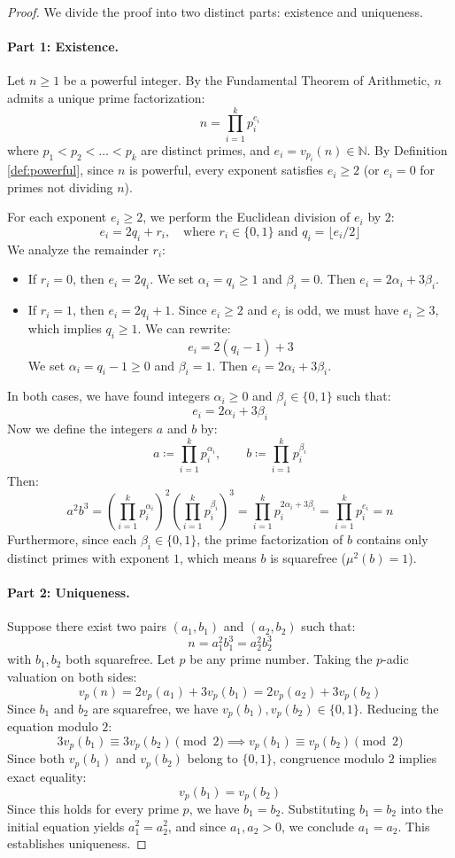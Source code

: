 \documentclass[11pt,a4paper]{article}
\theoremstyle{definition}
\begin{document}
\begin{proof}
We divide the proof into two distinct parts: existence and uniqueness.

\paragraph{Part 1: Existence.}
Let $n \ge 1$ be a powerful integer. By the Fundamental Theorem of Arithmetic, $n$ admits a unique prime factorization:
\[ n = \prod_{i=1}^k p_i^{e_i} \]
where $p_1 < p_2 < \dots < p_k$ are distinct primes, and $e_i = v_{p_i}(n) \in \mathbb{N}$.
By Definition \ref{def:powerful}, since $n$ is powerful, every exponent satisfies $e_i \ge 2$ (or $e_i = 0$ for primes not dividing $n$).

For each exponent $e_i \ge 2$, we perform the Euclidean division of $e_i$ by $2$:
\[ e_i = 2 q_i + r_i, \quad \text{where } r_i \in \{0, 1\} \text{ and } q_i = \lfloor e_i / 2 \rfloor \]
We analyze the remainder $r_i$:
\begin{itemize}
    \item If $r_i = 0$, then $e_i = 2 q_i$. We set $\alpha_i = q_i \ge 1$ and $\beta_i = 0$. Then $e_i = 2\alpha_i + 3\beta_i$.
    \item If $r_i = 1$, then $e_i = 2 q_i + 1$. Since $e_i \ge 2$ and $e_i$ is odd, we must have $e_i \ge 3$, which implies $q_i \ge 1$.
    We can rewrite:
    \[ e_i = 2(q_i - 1) + 3 \]
    We set $\alpha_i = q_i - 1 \ge 0$ and $\beta_i = 1$. Then $e_i = 2\alpha_i + 3\beta_i$.
\end{itemize}
In both cases, we have found integers $\alpha_i \ge 0$ and $\beta_i \in \{0, 1\}$ such that:
\[ e_i = 2\alpha_i + 3\beta_i \]
Now we define the integers $a$ and $b$ by:
\[ a \coloneqq \prod_{i=1}^k p_i^{\alpha_i}, \qquad b \coloneqq \prod_{i=1}^k p_i^{\beta_i} \]
Then:
\[ a^2 b^3 = \left(\prod_{i=1}^k p_i^{\alpha_i}\right)^2 \left(\prod_{i=1}^k p_i^{\beta_i}\right)^3 = \prod_{i=1}^k p_i^{2\alpha_i + 3\beta_i} = \prod_{i=1}^k p_i^{e_i} = n \]
Furthermore, since each $\beta_i \in \{0, 1\}$, the prime factorization of $b$ contains only distinct primes with exponent $1$, which means $b$ is squarefree ($\mu^2(b) = 1$).

\paragraph{Part 2: Uniqueness.}
Suppose there exist two pairs $(a_1, b_1)$ and $(a_2, b_2)$ such that:
\[ n = a_1^2 b_1^3 = a_2^2 b_2^3 \]
with $b_1, b_2$ both squarefree. Let $p$ be any prime number. Taking the $p$-adic valuation on both sides:
\[ v_p(n) = 2 v_p(a_1) + 3 v_p(b_1) = 2 v_p(a_2) + 3 v_p(b_2) \]
Since $b_1$ and $b_2$ are squarefree, we have $v_p(b_1), v_p(b_2) \in \{0, 1\}$.
Reducing the equation modulo $2$:
\[ 3 v_p(b_1) \equiv 3 v_p(b_2) \pmod 2 \implies v_p(b_1) \equiv v_p(b_2) \pmod 2 \]
Since both $v_p(b_1)$ and $v_p(b_2)$ belong to $\{0, 1\}$, congruence modulo $2$ implies exact equality:
\[ v_p(b_1) = v_p(b_2) \]
Since this holds for every prime $p$, we have $b_1 = b_2$.
Substituting $b_1 = b_2$ into the initial equation yields $a_1^2 = a_2^2$, and since $a_1, a_2 > 0$, we conclude $a_1 = a_2$.
This establishes uniqueness.


\end{proof}
\end{document}
